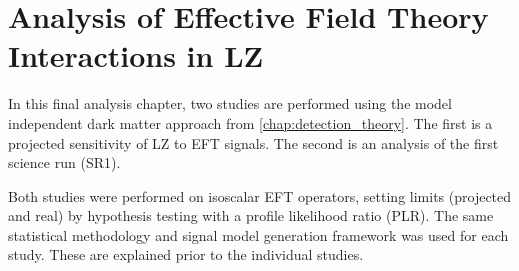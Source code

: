 \chapter{Analysis of Effective Field Theory Interactions in LZ}
\label{chap:analysis_eft_work}
In this final analysis chapter, two studies are performed using the model independent dark matter approach from \autoref{chap:detection_theory}.
The first is a projected sensitivity of LZ to EFT signals.
The second is an analysis of the first science run (SR1).
\par
Both studies were performed on isoscalar EFT operators, setting limits (projected and real) by hypothesis testing with a profile likelihood ratio (PLR).
The same statistical methodology and signal model generation framework was used for each study.
These are explained prior to the individual studies.



%







%

%

%

